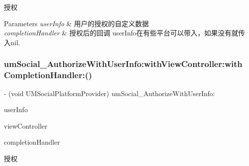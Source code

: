 授权


\begin{DoxyParams}{Parameters}
{\em user\+Info} & 用户的授权的自定义数据 \\
\hline
{\em completion\+Handler} & 授权后的回调  user\+Info在有些平台可以带入，如果没有就传入nil. \\
\hline
\end{DoxyParams}
\mbox{\label{protocol_u_m_social_platform_provider_01-p_a99c9538562ad13c437698eadbd8fe7c6}} 
\subsubsection{\texorpdfstring{um\+Social\+\_\+\+Authorize\+With\+User\+Info\+:with\+View\+Controller\+:with\+Completion\+Handler\+:()}{umSocial\_AuthorizeWithUserInfo:withViewController:withCompletionHandler:()}\hspace{0.1cm}{\footnotesize\ttfamily [1/2]}}
{\footnotesize\ttfamily -\/ (void U\+M\+Social\+Platform\+Provider) um\+Social\+\_\+\+Authorize\+With\+User\+Info\+: \begin{DoxyParamCaption}\item[{(N\+S\+Dictionary $\ast$)}]{user\+Info }\item[{withViewController:(U\+I\+View\+Controller $\ast$)}]{view\+Controller }\item[{withCompletionHandler:(U\+M\+Social\+Request\+Completion\+Handler)}]{completion\+Handler }\end{DoxyParamCaption}}

授权


